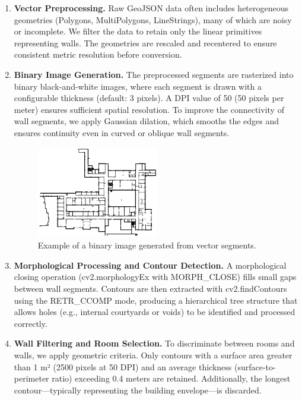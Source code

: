 \documentclass{article}
\begin{document}
\begin{enumerate}
    \item \textbf{Vector Preprocessing.} 
    Raw GeoJSON data often includes heterogeneous geometries (Polygons, MultiPolygons, LineStrings), many of which are noisy or incomplete. We filter the data to retain only the linear primitives representing walls. The geometries are rescaled and recentered to ensure consistent metric resolution before conversion.

    \item \textbf{Binary Image Generation.} 
    The preprocessed segments are rasterized into binary black-and-white images, where each segment is drawn with a configurable thickness (default: 3 pixels). A DPI value of 50 (50 pixels per meter) ensures sufficient spatial resolution. To improve the connectivity of wall segments, we apply Gaussian dilation, which smooths the edges and ensures continuity even in curved or oblique wall segments.

    \begin{figure}[h]
        \centering
        \includegraphics[width=0.6\linewidth, height=4cm, keepaspectratio]{01.binary_image.png}
        \caption{Example of a binary image generated from vector segments.}
        \label{fig:binary_image}
    \end{figure}

    \item \textbf{Morphological Processing and Contour Detection.} 
    A morphological closing operation (cv2.morphologyEx with MORPH\_CLOSE) fills small gaps between wall segments. Contours are then extracted with cv2.findContours using the RETR\_CCOMP mode, producing a hierarchical tree structure that allows holes (e.g., internal courtyards or voids) to be identified and processed correctly.

    \item \textbf{Wall Filtering and Room Selection.} 
    To discriminate between rooms and walls, we apply geometric criteria. Only contours with a surface area greater than 1 m² (2500 pixels at 50 DPI) and an average thickness (surface-to-perimeter ratio) exceeding 0.4 meters are retained. Additionally, the longest contour—typically representing the building envelope—is discarded.


\end{enumerate}
\end{document}
